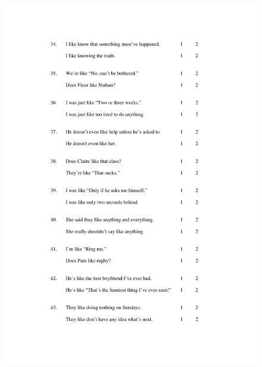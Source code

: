 \begin{figure}
	\centering
		\includegraphics[width=5in]{images/Exp2page5.pdf}
			\label{x2p5}
\end{figure}


